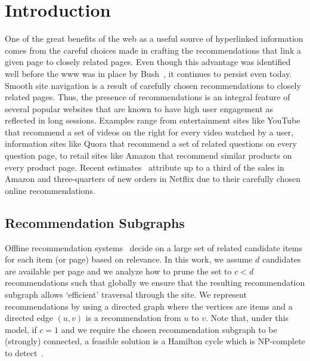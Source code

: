 
\section{Introduction}

One of the great benefits of the web as a useful source of hyperlinked
information comes from the careful choices made in crafting the recommendations
that link a given page to closely related pages. Even though this advantage was
identified well before the www was in place by Bush~\cite{Bush45aswe}, it continues
to persist even today. Smooth site navigation is a result of carefully chosen
recommendations to closely related pages. Thus, the presence of recommendations
is an integral feature of several popular websites that are known to have high
user engagement as reflected in long sessions. Examples range from
entertainment sites like YouTube that recommend a set of videos on the right
for every video watched by a user, information sites like Quora that recommend
a set of related questions on every question page, to retail sites like Amazon
that recommend similar products on every product page. Recent estimates~\cite{big-data-book13} attribute up to a third of the sales in Amazon and three-quarters of new orders in Netflix due to their carefully chosen online recommendations. 

\subsection{Recommendation Subgraphs}
Offline recommendation systems~\cite{Schafer1999, Adomavicius2005, Resnick1997}
decide on a large set of related candidate items for each item (or page) based
on relevance. In this work, we assume $d$ candidates are available per page and 
we analyze how to prune the set to $c < d$ recommendations such that globally we ensure that the resulting recommendation subgraph allows `efficient' traversal through the site. We represent recommendations by using a directed graph where the vertices are items and a directed edge $(u, v)$ is a recommendation from $u$ to $v$. Note that, under this model, if $c=1$ and we require the chosen recommendation subgraph to be (strongly) connected, a feasible solution is a Hamilton cycle which is NP-complete to detect~\cite{CLRS2001}. \vs


